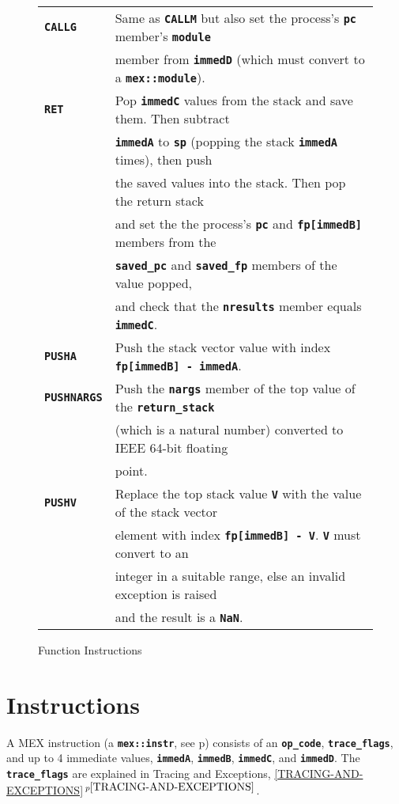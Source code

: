 \documentclass[12pt]{article}
\newcommand{\TT}[1]{{\tt \bfseries #1}}
\newcommand{\itemref}[1]{\ref{#1}$\,^{p\pageref{#1}}$}
\newcommand{\pagref}[1]{p\pageref{#1}}
\newlength{\figurewidth}
\newenvironment{boxedfigure}[1][!btp]%
	{\begin{figure*}[#1]
	 \begin{lrbox}{\figurebox}
	 \begin{minipage}{\figurewidth}

	 \vspace*{1ex}}%
	{
	 \vspace*{1ex}

	 \end{minipage}
	 \end{lrbox}

	 \centering
	 \fbox{\hspace*{0.1in}\usebox{\figurebox}\hspace*{0.1in}}
	 \end{figure*}}
\begin{document}
\begin{boxedfigure}
\begin{center}
\begin{tabular}{|l|l|}
\TT{CALLG}
    & Same as \TT{CALLM} but also set the process's \TT{pc} member's 
                                                           \TT{module} \\
    & member from \TT{immedD} (which must convert to a \TT{mex::module}).
\\\hline
\TT{RET}
    & Pop \TT{immedC} values from the stack and save them.  Then subtract \\
    & \TT{immedA} to \TT{sp} (popping the stack \TT{immedA} times), then push \\
    & the saved values into the stack.  Then pop the return stack \\
    & and set the the process's \TT{pc} and \TT{fp[immedB]} members from the \\
    & \TT{saved\_pc} and \TT{saved\_fp} members of the value popped, \\
    & and check that the \TT{nresults} member equals \TT{immedC}.
\\\hline
\TT{PUSHA}
    & Push the stack vector value with index \TT{fp[immedB] - immedA}.
\\\hline
\TT{PUSHNARGS}
    & Push the \TT{nargs} member of the top value of the \TT{return\_stack} \\
    & (which is a natural number) converted to IEEE 64-bit floating \\
    & point.
\\\hline
\TT{PUSHV}
    & Replace the top stack value \TT{V} with the value of the stack vector \\
    & element with index \TT{fp[immedB] - V}.  \TT{V} must convert to an \\
    & integer in a suitable range, else an invalid exception is raised \\
    & and the result is a \TT{NaN}.
\\\hline
\end{tabular}
\end{center}
\caption{Function Instructions}
\label{FUNCTION-INSTRUCTIONS}
\end{boxedfigure}

\clearpage

\section{Instructions}
\label{INSTRUCTIONS}

A MEX instruction (a \TT{mex::instr}, see \pagref{MEX::INSTR})
consists of an \TT{op\_code}, \TT{trace\_flags},
and up to 4 immediate values,
\TT{immedA}, \TT{immedB}, \TT{immedC}, and \TT{immedD}.
The \TT{trace\_flags} are explained in Tracing and Exceptions,
\itemref{TRACING-AND-EXCEPTIONS}.
\end{document}
